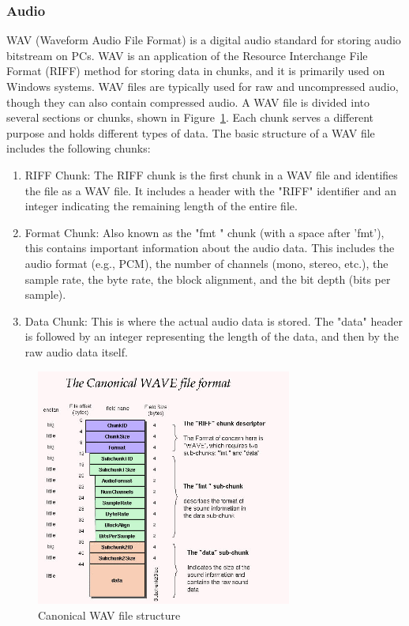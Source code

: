 \documentclass{article}
\begin{document}
\subsubsection{Audio}
WAV (Waveform Audio File Format) is a digital audio standard for storing audio bitstream on PCs. 
WAV is an application of the Resource Interchange File Format (RIFF) method for storing data in chunks, and it is primarily used on Windows systems. 
WAV files are typically used for raw and uncompressed audio, though they can also contain compressed audio.
A WAV file is divided into several sections or chunks, shown in Figure~\ref{fig:canonical-wav-structure}. Each chunk serves a different purpose and holds different types of data. The basic structure of a WAV file includes the following chunks:
\begin{enumerate}
    \item RIFF Chunk: The RIFF chunk is the first chunk in a WAV file and identifies the file as a WAV file. It includes a header with the "RIFF" identifier and an integer indicating the remaining length of the entire file.
    \item Format Chunk: Also known as the "fmt " chunk (with a space after 'fmt'), this contains important information about the audio data. This includes the audio format (e.g., PCM), the number of channels (mono, stereo, etc.), the sample rate, the byte rate, the block alignment, and the bit depth (bits per sample).
    \item Data Chunk: This is where the actual audio data is stored. The "data" header is followed by an integer representing the length of the data, and then by the raw audio data itself.
\end{enumerate}


\begin{figure}[htb]
    \centering
    \includegraphics[width=0.75\textwidth]{canonical-wav-file-structure.jpg}
    \caption{Canonical WAV file structure}
    \label{fig:canonical-wav-structure}
\end{figure}
\end{document}
